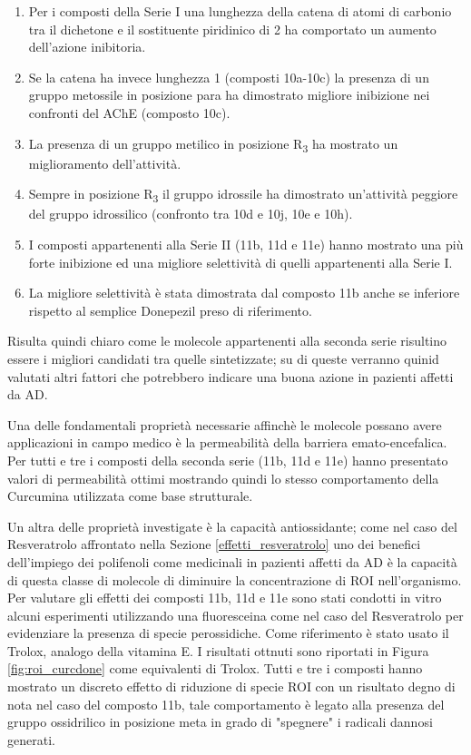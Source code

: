 \documentclass[a4paper, 12pt]{article}
\begin{document}
\begin{enumerate}
	\item Per i composti della Serie I una lunghezza della catena di atomi di carbonio tra il dichetone e il sostituente piridinico di 2 ha comportato un aumento dell'azione inibitoria.
	\item Se la catena ha invece lunghezza 1 (composti 10a-10c) la presenza di un gruppo metossile in posizione para ha dimostrato migliore inibizione nei confronti del AChE (composto 10c).
	\item La presenza di un gruppo metilico in posizione R\textsubscript{3} ha mostrato un miglioramento dell'attività.
	\item Sempre in posizione R\textsubscript{3} il gruppo idrossile ha dimostrato un'attività peggiore del gruppo idrossilico (confronto tra 10d e 10j, 10e e 10h).
	\item I composti appartenenti alla Serie II (11b, 11d e 11e) hanno mostrato una più forte inibizione ed una migliore selettività di quelli appartenenti alla Serie I.
	\item La migliore selettività è stata dimostrata dal composto 11b anche se inferiore rispetto al semplice Donepezil preso di riferimento.
\end{enumerate}

Risulta quindi chiaro come le molecole appartenenti alla seconda serie risultino essere i migliori candidati tra quelle sintetizzate; su di queste verranno quinid valutati altri fattori che potrebbero indicare una buona azione in pazienti affetti da AD.

Una delle fondamentali proprietà necessarie affinchè le molecole possano avere applicazioni in campo medico è la permeabilità della barriera emato-encefalica. Per tutti e tre i composti della seconda serie (11b, 11d e 11e) hanno presentato valori di permeabilità ottimi mostrando quindi lo stesso comportamento della Curcumina utilizzata come base strutturale.

Un altra delle proprietà investigate è la capacità antiossidante; come nel caso del Resveratrolo affrontato nella Sezione \ref{effetti_resveratrolo} uno dei benefici dell'impiego dei polifenoli come medicinali in pazienti affetti da AD è la capacità di questa classe di molecole di diminuire la concentrazione di ROI nell'organismo. Per valutare gli effetti dei composti 11b, 11d e 11e sono stati condotti in vitro alcuni esperimenti utilizzando una fluoresceina come nel caso del Resveratrolo per evidenziare la presenza di specie perossidiche. Come riferimento è stato usato il Trolox, analogo della vitamina E. I risultati ottnuti sono riportati in Figura \ref{fig:roi_curcdone} come equivalenti di Trolox. Tutti e tre i composti hanno mostrato un discreto effetto di riduzione di specie ROI con un risultato degno di nota nel caso del composto 11b, tale comportamento è legato alla presenza del gruppo ossidrilico in posizione meta in grado di "spegnere" i radicali dannosi generati.
\end{document}

